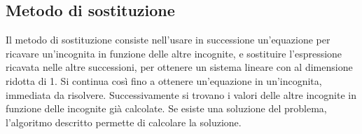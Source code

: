\documentclass[letterpaper,10pt,italian]{jupyterBook}
\begin{document}
\subsection{Metodo di sostituzione}
\label{\detokenize{ch/algebra/linear-algebra:metodo-di-sostituzione}}\label{\detokenize{ch/algebra/linear-algebra:math-hs-algebra-linear-linear-system-sol-substitution}}
\sphinxAtStartPar
Il metodo di sostituzione consiste nell’usare in successione un’equazione per ricavare un’incognita in funzione delle altre incognite, e sostituire l’espressione ricavata nelle altre successioni, per ottenere un sistema lineare con al dimensione ridotta di 1. Si continua così fino a ottenere un’equazione in un’incognita, immediata da risolvere. Successivamente si trovano i valori delle altre incognite in funzione delle incognite già calcolate. Se esiste una soluzione del problema, l’algoritmo descritto permette di calcolare la soluzione.    
\label{ch/algebra/linear-algebra:linsys-subs}
\end{document}
